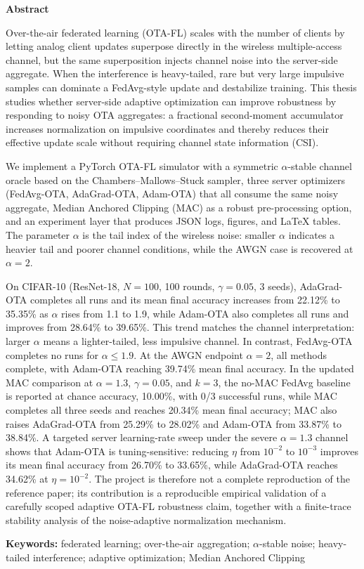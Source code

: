 \centerline{\xiaoyi\bfseries Abstract}
\vspace{4em}

Over-the-air federated learning (OTA-FL) scales with the number of
clients by letting analog client updates superpose directly in the
wireless multiple-access channel, but the same superposition injects
channel noise into the server-side aggregate. When the interference is
heavy-tailed, rare but very large impulsive samples can dominate a
FedAvg-style update and destabilize training. This thesis studies whether
server-side adaptive optimization can improve robustness by responding to
noisy OTA aggregates: a fractional second-moment accumulator increases
normalization on impulsive coordinates and thereby reduces their effective
update scale without requiring channel state information (CSI).

We implement a PyTorch OTA-FL simulator with a symmetric
$\alpha$-stable channel oracle based on the Chambers--Mallows--Stuck
sampler, three server optimizers
(FedAvg-OTA, AdaGrad-OTA, Adam-OTA) that all consume the
same noisy aggregate, Median Anchored Clipping (MAC) as a robust
pre-processing option, and an experiment layer that produces JSON
logs, figures, and LaTeX tables. The parameter $\alpha$ is the tail
index of the wireless noise: smaller $\alpha$ indicates a heavier tail
and poorer channel conditions, while the AWGN case is recovered at
$\alpha=2$.

On CIFAR-10 (ResNet-18, $N=100$, 100 rounds, $\gamma=0.05$, 3 seeds),
AdaGrad-OTA completes all runs and its mean final accuracy increases
from 22.12\% to 35.35\% as $\alpha$ rises from 1.1 to 1.9, while
Adam-OTA also completes all runs and improves from 28.64\% to 39.65\%.
This trend matches the channel interpretation: larger $\alpha$ means a
lighter-tailed, less impulsive channel. In contrast, FedAvg-OTA
completes no runs for $\alpha\leq1.9$. At the AWGN endpoint
$\alpha=2$, all methods complete, with Adam-OTA reaching 39.74\% mean
final accuracy. In the updated MAC comparison at
$\alpha=1.3$, $\gamma=0.05$, and $k=3$, the no-MAC FedAvg baseline is
reported at chance accuracy, 10.00\%, with 0/3 successful runs, while
MAC completes all three seeds and reaches 20.34\% mean final accuracy;
MAC also raises AdaGrad-OTA from 25.29\% to 28.02\% and Adam-OTA from
33.87\% to 38.84\%. A targeted server
learning-rate sweep under the severe $\alpha=1.3$ channel shows that
Adam-OTA is tuning-sensitive: reducing $\eta$ from $10^{-2}$ to
$10^{-3}$ improves its mean final accuracy from 26.70\% to 33.65\%,
while AdaGrad-OTA reaches 34.62\% at $\eta=10^{-2}$. The project is
therefore not a complete reproduction of the reference paper; its
contribution is a reproducible empirical validation of a carefully
scoped adaptive OTA-FL robustness claim, together with a finite-trace
stability analysis of the noise-adaptive normalization mechanism.

\noindent\textbf{Keywords:} federated learning; over-the-air aggregation;
$\alpha$-stable noise; heavy-tailed interference; adaptive
optimization; Median Anchored Clipping
